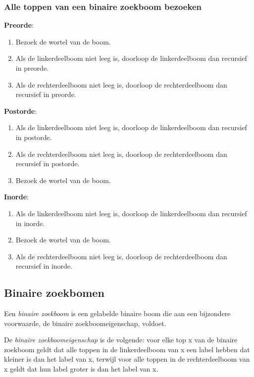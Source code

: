 \documentclass[a4paper,12pt]{article}
\begin{document}
\subsubsection{Alle toppen van een binaire zoekboom bezoeken}
\textbf{Preorde}:

\begin{enumerate}
\item Bezoek de wortel van de boom.
\item Als de linkerdeelboom niet leeg is, doorloop de linkerdeelboom dan recursief in preorde.
\item Als de rechterdeelboom niet leeg is, doorloop de rechterdeelboom dan recursief in preorde.
\end{enumerate}

\textbf{Postorde}:

\begin{enumerate}
\item Als de linkerdeelboom niet leeg is, doorloop de linkerdeelboom dan recursief in postorde.
\item Als de rechterdeelboom niet leeg is, doorloop de rechterdeelboom dan recursief in postorde.
\item Bezoek de wortel van de boom.
\end{enumerate}

\textbf{Inorde}:

\begin{enumerate}
\item Als de linkerdeelboom niet leeg is, doorloop de linkerdeelboom dan recursief in inorde.
\item Bezoek de wortel van de boom.
\item Als de rechterdeelboom niet leeg is, doorloop de rechterdeelboom dan recursief in inorde.

\end{enumerate}

\subsection{Binaire zoekbomen}
Een \textit{binaire zoekboom} is een gelabelde binaire boom die aan een
bijzondere voorwaarde, de binaire zoekboomeigenschap, voldoet.

De \textit{binaire zoekboomeigenschap} is de volgende: voor elke top
x van de binaire zoekboom geldt dat alle toppen in de linkerdeelboom van x een label hebben dat kleiner is dan het label van x, terwijl voor alle toppen in de rechterdeelboom van x geldt dat hun label groter is dan het label van x.
\end{document}
